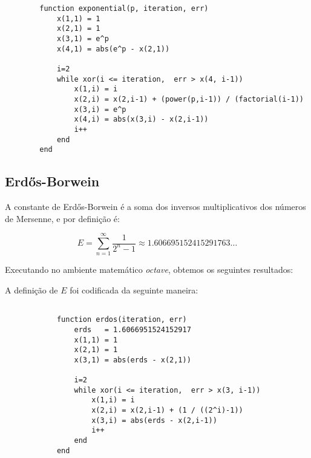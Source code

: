 		\begin{lstlisting}
		function exponential(p, iteration, err)
			x(1,1) = 1
			x(2,1) = 1
			x(3,1) = e^p
			x(4,1) = abs(e^p - x(2,1))

			i=2
			while xor(i <= iteration,  err > x(4, i-1))
				x(1,i) = i
				x(2,i) = x(2,i-1) + (power(p,i-1)) / (factorial(i-1))
				x(3,i) = e^p
				x(4,i) = abs(x(3,i) - x(2,i-1))
				i++
			end
		end
		\end{lstlisting}

	\subsection{Erdős-Borwein}

		A constante de Erdős-Borwein é a soma dos inversos multiplicativos dos
		números de Mersenne, e por definição é:

		\begin{equation}
			E = \displaystyle\sum_{n=1}^{\infty} \frac{1}{2^n-1} \approx 1.606695152415291763\dots
		\end{equation}

		Executando no ambiente matemático \emph{octave}, obtemos os seguintes
		resultados:

		

		A definição de $E$ foi codificada da seguinte maneira:

		\begin{lstlisting}

			function erdos(iteration, err)
				erds   = 1.6066951524152917
				x(1,1) = 1
				x(2,1) = 1
				x(3,1) = abs(erds - x(2,1))

				i=2
				while xor(i <= iteration,  err > x(3, i-1))
					x(1,i) = i
					x(2,i) = x(2,i-1) + (1 / ((2^i)-1))
					x(3,i) = abs(erds - x(2,i-1))
					i++
				end
			end

		\end{lstlisting}
